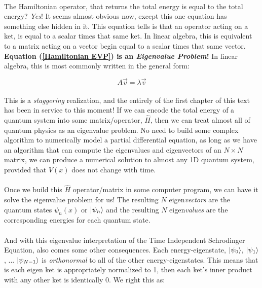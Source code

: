 \documentclass[12pt,letterpaper]{book}
\begin{document}
\paragraph*{}The Hamiltonian operator, that returns the total energy is equal to the total energy? \textit{Yes}! It seems almost obvious now, except this one equation has something else hidden in it. This equation tells is that an operator acting on a ket, is equal to a scalar times that same ket. In linear algebra, this is equivalent to a matrix acting on a vector begin equal to a scalar times that same vector. \textbf{Equation (\ref{Hamiltonian EVP}) is an \textit{Eigenvalue Problem}!} In linear algebra, this is most commonly written in the general form:

\begin{equation}
A\vec{v} = \lambda \vec{v}
\end{equation}

\paragraph*{}This is a \textit{staggering} realization, and the entirely of the first chapter of this text has been in service to this moment! If we can encode the total energy of a quantum system into some matrix/operator, $\hat{H}$, then we can treat almost all of quantum physics as an eigenvalue problem. No need to build some complex algorithm to numerically model a partial differential equation, as long as we have an algorithm that can compute the eigenvalues and eigenvectors of an $N \times N$ matrix, we can produce a numerical solution to almost any 1D quantum system, provided that $V(x)$ does not change with time.

\paragraph*{}Once we build this $\hat{H}$ operator/matrix in some computer program, we can have it solve the eigenvalue problem for us! The resulting $N$ eigen\textit{vectors} are the quantum states $\psi_n(x)$ or $\ket{\psi_n}$ and the resulting $N$ eigen\textit{values} are the corresponding energies for each quantum state.

\paragraph*{}And with this eigenvalue interpretation of the Time Independent Schrodinger Equation, also comes some other consequences. Each energy-eigenstate, $\ket{\psi_0}$, $\ket{\psi_1}$, ...  $\ket{\psi_{N-1}}$ is \textit{orthonormal} to all of the other energy-eigenstates. This means that is each eigen ket is appropriately normalized to 1, then each ket's inner product with any other ket is identically 0. We right this as:
\end{document}
